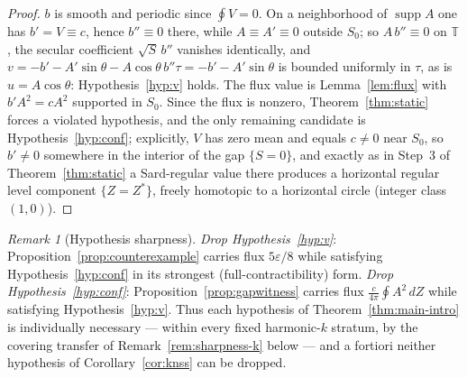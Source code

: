 \documentclass[11pt]{amsart}
\theoremstyle{definition}
\theoremstyle{remark}
\newtheorem{remark}[theorem]{Remark}
\newcommand{\T}{\mathbb{T}}
\begin{document}
\begin{proof}
$b$ is smooth and periodic since $\oint V=0$. On a neighborhood of
$\operatorname{supp}A$ one has $b'=V\equiv c$, hence $b''\equiv0$
there, while $A\equiv A'\equiv0$ outside $S_0$; so $A\,b''\equiv0$ on
$\T$, the secular coefficient $\sqrt S\,b''$ vanishes identically, and
$v=-b'-A'\sin\theta-A\cos\theta\,b''\tau=-b'-A'\sin\theta$ is bounded
uniformly in $\tau$, as is $u=A\cos\theta$:
Hypothesis~\ref{hyp:v} holds. The flux value is
Lemma~\ref{lem:flux} with $b'A^2=cA^2$ supported in $S_0$. Since the
flux is nonzero, Theorem~\ref{thm:static} forces a violated
hypothesis, and the only remaining candidate is
Hypothesis~\ref{hyp:conf}; explicitly, $V$ has zero mean and equals
$c\neq0$ near $S_0$, so $b'\neq0$ somewhere in the interior of the gap
$\{S=0\}$, and exactly as in Step~3 of Theorem~\ref{thm:static} a
Sard-regular value there produces a horizontal regular level component
$\{Z=Z^*\}$, freely homotopic to a horizontal circle (integer class
$(1,0)$).
\end{proof}

\begin{remark}[Hypothesis sharpness]\label{rem:table}
\emph{Drop Hypothesis~\ref{hyp:v}}:
Proposition~\ref{prop:counterexample} carries flux $5\varepsilon/8$
while satisfying Hypothesis~\ref{hyp:conf} in its strongest
(full-contractibility) form. \emph{Drop Hypothesis~\ref{hyp:conf}}:
Proposition~\ref{prop:gapwitness} carries flux
$\frac{c}{4\pi}\oint A^2\,dZ$ while satisfying
Hypothesis~\ref{hyp:v}. Thus each hypothesis of
Theorem~\ref{thm:main-intro} is individually necessary --- within every
fixed harmonic-$k$ stratum, by the covering transfer of
Remark~\ref{rem:sharpness-k} below --- and a fortiori neither
hypothesis of Corollary~\ref{cor:knss} can be dropped.
\end{remark}
\end{document}

